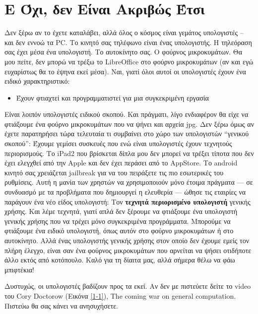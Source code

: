 \section{Ε Όχι, δεν Είναι Ακριβώς Έτσι}
%
Δεν ξέρω αν το έχετε καταλάβει, αλλά όλος ο κόσμος είναι γεμάτος υπολογιστές
-- και δεν εννοώ τα PC. Το κινητό σας τηλέφωνο είναι ένας υπολογιστής. Η
τηλεόραση σας έχει μέσα ένα υπολογιστή. Το αυτοκίνητο σας. Ο φούρνος
μικροκυμάτων. Θα μου πείτε, δεν μπορώ να τρέξω το LibreOffice στο φούρνο
μικροκυμάτων (αν και εγώ ευχαρίστως θα το έψηνα εκεί μέσα). Ναι, γιατί όλοι
αυτοί οι υπολογιστές έχουν ένα ειδικό χαρακτηριστικό:
%
\begin{itemize}
\item Έχουν φτιαχτεί και προγραμματιστεί για μια συγκεκριμένη εργασία
\end{itemize}
%
Είναι λοιπόν υπολογιστές ειδικού σκοπού. Και πράγματι, λίγο ενδιαφέρον θα
είχε να φτιάξουμε ένα φούρνο μικροκυμάτων που να ψήνει και αρχεία jpg. Δεν
ξέρω όμως αν έχετε παρατηρήσει τώρα τελευταία τι συμβαίνει στο χώρο των
υπολογιστών ``γενικού σκοπού'': Έχουμε γεμίσει συσκευές που ενώ είναι
υπολογιστές έχουν τεχνητούς περιορισμούς. Το iPad2 που βρίσκεται δίπλα μου
δεν μπορεί να τρέξει τίποτα που δεν έχει ελεγχθεί από την Apple και δεν έχει
περάσει από το AppStore. Το android κινητό σας χρειάζεται jailbreak για να
του πειράξετε τις πιο εσωτερικές του ρυθμίσεις. Αυτή η μανία των χρηστών να
χρησιμοποιούν μόνο έτοιμα πράγματα --- σε συνδυασμό με τα προβλήματα που
δημιουργεί η ελευθερία --- ώθησε τις εταιρίες να παράγουν ένα νέο είδος
υπολογιστή: Τον {\bf τεχνητά περιορισμένο υπολογιστή} γενικής χρήσης. Και λέμε
τεχνητά, γιατί απλά δεν ξέρουμε να φτιάξουμε ένα υπολογιστή γενικής χρήσης
που να τρέχει μόνο συγκεκριμένα προγράμματα. Μπορούμε να φτιάξουμε ένα
ειδικό υπολογιστή, όπως αυτόν στο φούρνο μικροκυμάτων ή στο αυτοκίνητο. Αλλά
ένας υπολογιστής γενικής χρήσης στον οποίο δεν έχουμε εμείς τον πλήρη
έλεγχο, είναι σαν ένα φούρνος μικροκυμάτων που αρνείται να ψήσει οτιδήποτε
άλλο εκτός από κοτόπουλο. Καλό για τη δίαιτα μας, αλλά σήμερα θέλω να φάω
μπιφτέκια!

Δυστυχώς, οι υπολογιστές βαδίζουν προς τα εκεί. Αν δεν με πιστεύετε δείτε το
video του Cory Doctorow (Εικόνα \ref{1-1}), The coming war on general computation. Πιστεύω θα σας κάνει να ανησυχήσετε.


